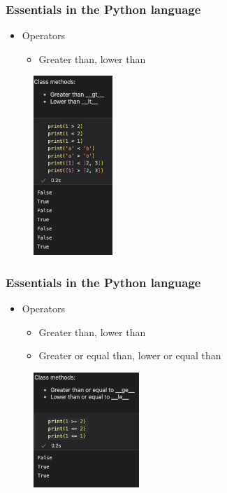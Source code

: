 \begin{frame}\frametitle{Essentials in the Python language}
   \begin{minipage}{0.48\linewidth}
      \begin{itemize}
         \item Operators
         \begin{itemize}
            \item Greater than, lower than
         \end{itemize}
      \end{itemize}
   \end{minipage}
   \begin{minipage}{0.48\linewidth}
      \begin{figure}[H]
         \includegraphics[width=3cm]{../images/illustrations/gt_lt.jpg}
      \end{figure}
   \end{minipage}
\end{frame}

\begin{frame}\frametitle{Essentials in the Python language}
   \begin{minipage}{0.48\linewidth}
      \begin{itemize}
         \item Operators
         \begin{itemize}
            \item Greater than, lower than
            \item Greater or equal than, lower or equal than
         \end{itemize}
      \end{itemize}
   \end{minipage}
   \begin{minipage}{0.48\linewidth}
      \begin{figure}[H]
         \includegraphics[width=4cm]{../images/illustrations/ge_le.jpg}
      \end{figure}
   \end{minipage}
\end{frame}

